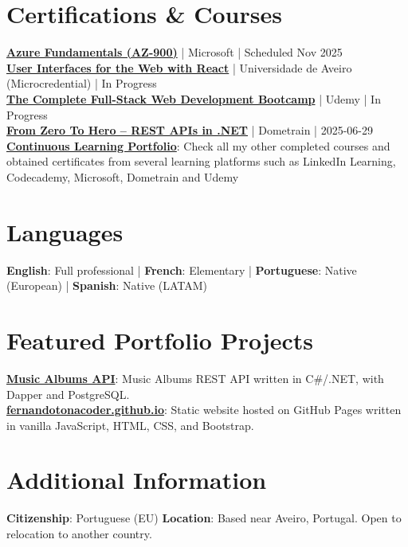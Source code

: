 \documentclass[a4paper,10pt]{article}
\begin{document}
\section{Certifications \& Courses}
\vspace{2pt}
{\small
\href{https://learn.microsoft.com/en-us/credentials/certifications/azure-fundamentals/?practice-assessment-type=certification}{\textbf{Azure Fundamentals (AZ-900)}} | Microsoft | Scheduled Nov 2025\\[2pt]
\href{https://www.ua.pt/en/uc/16468}{\textbf{User Interfaces for the Web with React}} | Universidade de Aveiro (Microcredential) | In Progress\\[2pt]
\href{https://www.udemy.com/course/the-complete-web-development-bootcamp/}{\textbf{The Complete Full-Stack Web Development Bootcamp}} | Udemy | In Progress\\[2pt]
\href{https://github.com/fernandotonacoder/continuous-learning-portfolio/blob/main/certificates/2025/2025-06-29%20From%20Zero%20To%20Hero%20-%20REST%20APIs%20in%20dotnet.pdf}{\textbf{From Zero To Hero – REST APIs in .NET}} | Dometrain | 2025-06-29\\[2pt]
\href{https://github.com/fernandotonacoder/continuous-learning-portfolio/tree/main/certificates}{\textbf{Continuous Learning Portfolio}}: Check all my other completed courses and obtained certificates from several learning platforms such as LinkedIn Learning, Codecademy, Microsoft, Dometrain and Udemy
}

\section{Languages}
\vspace{2pt}
{\small
\textbf{English}: Full professional \quad | \quad
\textbf{French}: Elementary \quad | \quad
\textbf{Portuguese}: Native (European) \quad | \quad
\textbf{Spanish}: Native (LATAM)
}

\section{Featured Portfolio Projects}
\vspace{2pt}
{\small
\textbf{\href{https://github.com/fernandotonacoder/music-albums-api}{Music Albums API}}: Music Albums REST API written in C\#/.NET, with Dapper and PostgreSQL.\\
\textbf{\href{https://github.com/fernandotonacoder/fernandotonacoder.github.io}{fernandotonacoder.github.io}}: Static website hosted on GitHub Pages written in vanilla JavaScript, HTML, CSS, and Bootstrap.
}

\section{Additional Information}
\vspace{2pt}
{\small
\textbf{Citizenship}: Portuguese (EU) \quad
\textbf{Location}: Based near Aveiro, Portugal. Open to relocation to another country. \quad
}
\end{document}
